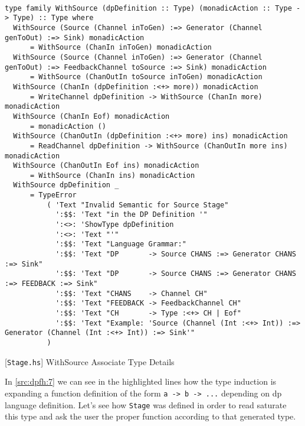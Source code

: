 \begin{listing}[H]
  \begin{verbatim}

type family WithSource (dpDefinition :: Type) (monadicAction :: Type -> Type) :: Type where
  WithSource (Source (Channel inToGen) :=> Generator (Channel genToOut) :=> Sink) monadicAction
      = WithSource (ChanIn inToGen) monadicAction
  WithSource (Source (Channel inToGen) :=> Generator (Channel genToOut) :=> FeedbackChannel toSource :=> Sink) monadicAction 
      = WithSource (ChanOutIn toSource inToGen) monadicAction
  WithSource (ChanIn (dpDefinition :<+> more)) monadicAction         
      = WriteChannel dpDefinition -> WithSource (ChanIn more) monadicAction
  WithSource (ChanIn Eof) monadicAction                              
      = monadicAction ()
  WithSource (ChanOutIn (dpDefinition :<+> more) ins) monadicAction  
      = ReadChannel dpDefinition -> WithSource (ChanOutIn more ins) monadicAction
  WithSource (ChanOutIn Eof ins) monadicAction                       
      = WithSource (ChanIn ins) monadicAction
  WithSource dpDefinition _                                          
      = TypeError
          ( 'Text "Invalid Semantic for Source Stage"
            ':$$: 'Text "in the DP Definition '"
            ':<>: 'ShowType dpDefinition
            ':<>: 'Text "'"
            ':$$: 'Text "Language Grammar:"
            ':$$: 'Text "DP       -> Source CHANS :=> Generator CHANS :=> Sink"
            ':$$: 'Text "DP       -> Source CHANS :=> Generator CHANS :=> FEEDBACK :=> Sink"
            ':$$: 'Text "CHANS    -> Channel CH"
            ':$$: 'Text "FEEDBACK -> FeedbackChannel CH"
            ':$$: 'Text "CH       -> Type :<+> CH | Eof"
            ':$$: 'Text "Example: 'Source (Channel (Int :<+> Int)) :=> Generator (Channel (Int :<+> Int)) :=> Sink'"
          )
  \end{verbatim}
  \caption{[\texttt{Stage.hs}] WithSource Associate Type Details}
  \label{src:dpfh:7}
\end{listing}

In \autoref{src:dpfh:7} we can see in the highlighted lines how the type induction is expanding a function definition of the form \texttt{a -> b -> ...} depending on \acrshort{dp} language definition. 
Let's see how \texttt{Stage} was defined in order to read saturate this type and ask the user the proper function according to that generated type.


